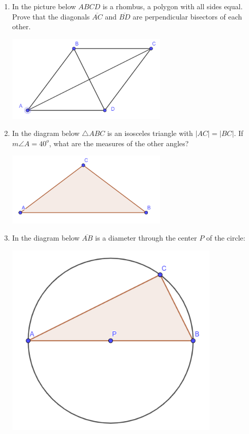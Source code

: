 \documentclass[12pt]{article}
\begin{document}
\begin{enumerate}
\item In the picture below $ABCD$ is a rhombus, a polygon with all sides equal.  Prove that the diagonals $\overline{AC}$ and $\overline{BD}$ are perpendicular bisectors of each other.

\includegraphics[width=3in]{geom-test3-img2.png}

\item In the diagram below $\triangle ABC$ is an isosceles triangle with $|AC| = |BC|$.
If $m \angle A = 40^o$, what are the measures of the other angles?

\includegraphics[width=3in]{geom-test3-img1.png}

\newpage

\item In the diagram below $\overline{AB}$ is a diameter through the center $P$ of the circle:

\includegraphics[width=4in]{geom-test3-img3.png}


\end{enumerate}
\end{document}
